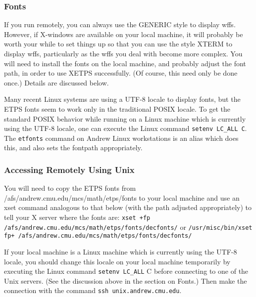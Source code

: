 \documentclass{article}
\begin{document}
\subsubsection{Fonts}

If you run {\ETPS} remotely, you can always use the
GENERIC style to display wffs. However, if X-windows are available on
your local machine, it will probably be worth your while to set things up so
that you can use the style XTERM to display wffs, particularly as the
wffs you deal with become more complex. You will need to install the
fonts on the local machine, and probably adjust the font path, in
order to use XETPS successfully. (Of course, this need only be done once.)
Details are discussed below.

Many recent Linux systems are using a UTF-8 locale to display fonts,
but the ETPS fonts seem to work only in the traditional POSIX
locale. To get the standard POSIX behavior while running on a Linux
machine which is currently using the UTF-8 locale, one can execute the
Linux command {\tt setenv LC{\_}ALL C}. The  {\tt etfonts} command on 
Andrew Linux workstations is an alias which does this, and also 
sets the fontpath appropriately.



\subsubsection{Accessing {\ETPS} Remotely Using Unix}

You will need to copy the ETPS fonts from
/afs/andrew.cmu.edu/mcs/math/etps/fonts to your local machine and use an
xset command analogous to that below (with the path adjusted
appropriately) to tell your X server where the fonts are: \newline{}
{\tt xset +fp /afs/andrew.cmu.edu/mcs/math/etps/fonts/decfonts/}\newline{}
or\newline{}
{\tt /usr/misc/bin/xset fp+ /afs/andrew.cmu.edu/mcs/math/etps/fonts/decfonts/}

If your local machine is a Linux
machine which is currently using the UTF-8 locale, you should change this
locale on your local machine temporarily by  executing the
Linux command \newline{}
{\tt setenv LC{\_}ALL} C \newline{}
before connecting to one of the Unix servers.
(See the discussion  above in the section on Fonts.) Then make the connection 
with the command \newline{}
{\tt ssh unix.andrew.cmu.edu}.
\end{document}
